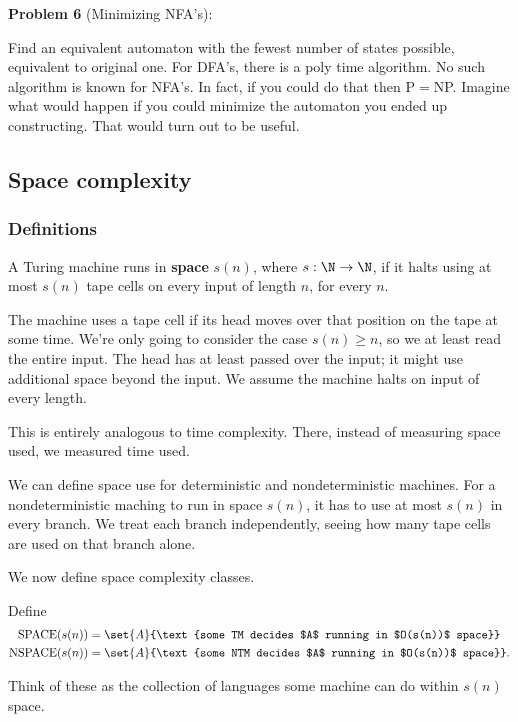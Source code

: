 \textbf{Problem 6} (Minimizing NFA's): 

Find an equivalent automaton with the fewest number of states possible, equivalent to original one. For DFA's, there is a poly time algorithm. No such algorithm is known for NFA's. In fact, if you could do that then P$=$NP. Imagine what would happen if you could minimize the automaton you ended up constructing. That would turn out to be useful.

\subsection{Space complexity}
\subsubsection{Definitions}
\begin{df}
A Turing machine runs in \textbf{space} $s(n)$, where $s:\N\to \N$, if it halts using at most $s(n)$ tape cells on every input of length $n$, for every $n$.
\end{df}

The machine uses a tape cell if its head moves over that position on the tape at some time. We're only going to consider the case $s(n)\ge n$, so we at least read the entire input. The head has at least passed over the input; it might use additional space beyond the input. %
We assume the machine halts on input of every length.

This is entirely analogous to time complexity. There, instead of measuring space used, we measured time used.

We can define space use for deterministic and nondeterministic machines. For a nondeterministic maching to run in space $s(n)$, it has to use at most $s(n)$  in every branch. We treat each branch independently, seeing how many tape cells are used on that branch alone.

We now define space complexity classes.
\begin{df}
Define 
\begin{align*}
\text{SPACE}(s(n))&=\set{A}{\text{some TM decides $A$ running in $O(s(n))$ space}}\\
\text{NSPACE}(s(n))&=\set{A}{\text{some NTM decides $A$ running in $O(s(n))$ space}}.
\end{align*}
\end{df}
Think of these as the collection of languages some machine can do within $s(n)$ space. 

